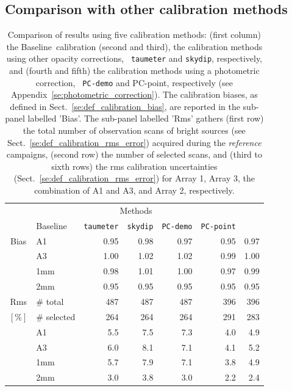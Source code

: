 \documentclass[traditionalabstract]{aa}
\newcommand{\baseline}{Baseline}%
\begin{document}
{\subsection{Comparison with other calibration methods}
\label{se:photometry_others}
\begin{table}[!htbp]
\begin{center}
\caption[Comparison of calibration results using five
  methods]{Comparison of results using five calibration
  methods: (first column) the \baseline\ calibration (second and
  third), the calibration methods using other opacity corrections, {\tt
  taumeter} and {\tt skydip}, respectively, and
  (fourth and fifth) the calibration methods using a photometric correction, {\tt
  PC-demo} and {PC-point}, respectively (see Appendix~\ref{se:photometric_correction}).  
  The calibration biases, as defined in
  Sect.~\ref{se:def_calibration_bias}, are reported in the sub-panel
  labelled 'Bias'. The sub-panel labelled 'Rms' gathers (first row) the total number of
  observation scans of bright sources (see
  Sect.~\ref{se:def_calibration_rms_error}) acquired during
  the \emph{reference} campaigns, (second row) the number of selected
  scans, and (third to sixth rows) the rms calibration uncertainties
  (Sect.~\ref{se:def_calibration_rms_error}) for Array 1, Array 3, the
  combination of A1 and A3, and Array 2, respectively. }
\label{tab:Calibration_results_all}
\begin{tabular}{clrrrrr}
  \hline\hline
  \noalign{\smallskip}
  \multicolumn{2}{c}{}  &  \multicolumn{5}{c}{Methods} \\\cline{3-7}
  \noalign{\smallskip}
  \multicolumn{2}{c}{Characteristics} &  \baseline\  & {\small {\tt taumeter}}  & {\small {\tt skydip}}  &  {\small {\tt PC-demo}} & {\small {\tt PC-point}} \\
  \hline
  \noalign{\smallskip}
  Bias &  A1            &   0.95   &  0.98    &  0.97    &   0.95    &  0.97  \\
       &  A3            &   1.00   &  1.02    &  1.02    &   0.99    &  1.00  \\
       &  1mm           &   0.98   &  1.01    &  1.00    &   0.97    &  0.99  \\
       &  2mm           &   0.95   &  0.95    &  0.95    &   0.95    &  0.95  \\
  \hline
  \noalign{\smallskip}
  Rms  &  $\#$ total      &   487    &    487   &    487    &    396    &  396 \\
  $[\%]$ &  $\#$ selected &   264    &    264   &    264    &    291    &  283 \\
       &  A1            &   5.5    &    7.5   &    7.3    &    4.0    &  4.9 \\
       &  A3            &   6.0    &    8.1   &    7.1    &    4.1    &  5.2 \\
       &  1mm           &   5.7    &    7.9   &    7.1    &    3.8    &  4.9 \\
       &  2mm           &   3.0    &    3.8   &    3.0    &    2.2    &  2.4 \\
\hline
\end{tabular}
\end{center}
\end{table}

}
\end{document}
